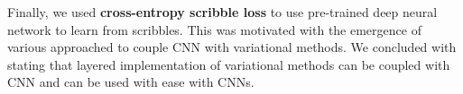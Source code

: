 Finally, we used \textbf{cross-entropy scribble loss} to use pre-trained deep neural network to learn from scribbles. This was motivated with the emergence of various approached to couple CNN with variational methods. We concluded with stating that layered implementation of variational methods can be coupled with CNN and can be used with ease with CNNs.